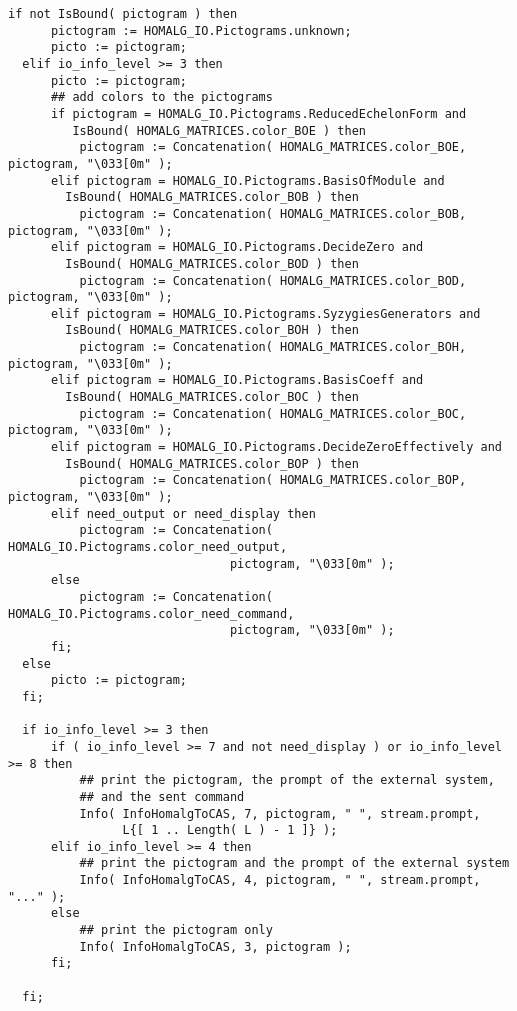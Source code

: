 \documentclass[a4paper,11pt]{report}
\begin{document}
{{{\begin{Verbatim}[fontsize=\small,frame=single,label=Code]
  if not IsBound( pictogram ) then
      pictogram := HOMALG_IO.Pictograms.unknown;
      picto := pictogram;
  elif io_info_level >= 3 then
      picto := pictogram;
      ## add colors to the pictograms
      if pictogram = HOMALG_IO.Pictograms.ReducedEchelonForm and
         IsBound( HOMALG_MATRICES.color_BOE ) then
          pictogram := Concatenation( HOMALG_MATRICES.color_BOE, pictogram, "\033[0m" );
      elif pictogram = HOMALG_IO.Pictograms.BasisOfModule and
        IsBound( HOMALG_MATRICES.color_BOB ) then
          pictogram := Concatenation( HOMALG_MATRICES.color_BOB, pictogram, "\033[0m" );
      elif pictogram = HOMALG_IO.Pictograms.DecideZero and
        IsBound( HOMALG_MATRICES.color_BOD ) then
          pictogram := Concatenation( HOMALG_MATRICES.color_BOD, pictogram, "\033[0m" );
      elif pictogram = HOMALG_IO.Pictograms.SyzygiesGenerators and
        IsBound( HOMALG_MATRICES.color_BOH ) then
          pictogram := Concatenation( HOMALG_MATRICES.color_BOH, pictogram, "\033[0m" );
      elif pictogram = HOMALG_IO.Pictograms.BasisCoeff and
        IsBound( HOMALG_MATRICES.color_BOC ) then
          pictogram := Concatenation( HOMALG_MATRICES.color_BOC, pictogram, "\033[0m" );
      elif pictogram = HOMALG_IO.Pictograms.DecideZeroEffectively and
        IsBound( HOMALG_MATRICES.color_BOP ) then
          pictogram := Concatenation( HOMALG_MATRICES.color_BOP, pictogram, "\033[0m" );
      elif need_output or need_display then
          pictogram := Concatenation( HOMALG_IO.Pictograms.color_need_output,
                               pictogram, "\033[0m" );
      else
          pictogram := Concatenation( HOMALG_IO.Pictograms.color_need_command,
                               pictogram, "\033[0m" );
      fi;
  else
      picto := pictogram;
  fi;
  
  if io_info_level >= 3 then
      if ( io_info_level >= 7 and not need_display ) or io_info_level >= 8 then
          ## print the pictogram, the prompt of the external system,
          ## and the sent command
          Info( InfoHomalgToCAS, 7, pictogram, " ", stream.prompt,
                L{[ 1 .. Length( L ) - 1 ]} );
      elif io_info_level >= 4 then
          ## print the pictogram and the prompt of the external system
          Info( InfoHomalgToCAS, 4, pictogram, " ", stream.prompt, "..." );
      else
          ## print the pictogram only
          Info( InfoHomalgToCAS, 3, pictogram );
      fi;
      
  fi;
\end{Verbatim}
 }

}}
\end{document}
